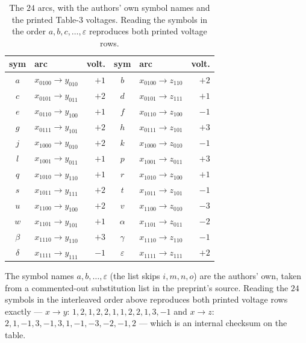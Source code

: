 \documentclass[11pt]{amsart}
\theoremstyle{remark}
\begin{document}
\begin{table}[ht]
\caption{The $24$ arcs, with the authors' own symbol names and the printed
Table-3 voltages. Reading the symbols in the order
$a,b,c,\dots,\varepsilon$ reproduces both printed voltage rows.}\label{tab:arcs}
\small
\begin{tabular}{@{}clr@{\qquad}clr@{}}
\toprule
sym & arc & volt. & sym & arc & volt.\\
\midrule
$a$ & $x_{0100}\to y_{010}$ & $+1$ & $b$ & $x_{0100}\to z_{110}$ & $+2$\\
$c$ & $x_{0101}\to y_{011}$ & $+2$ & $d$ & $x_{0101}\to z_{111}$ & $+1$\\
$e$ & $x_{0110}\to y_{100}$ & $+1$ & $f$ & $x_{0110}\to z_{100}$ & $-1$\\
$g$ & $x_{0111}\to y_{101}$ & $+2$ & $h$ & $x_{0111}\to z_{101}$ & $+3$\\
$j$ & $x_{1000}\to y_{010}$ & $+2$ & $k$ & $x_{1000}\to z_{010}$ & $-1$\\
$l$ & $x_{1001}\to y_{011}$ & $+1$ & $p$ & $x_{1001}\to z_{011}$ & $+3$\\
$q$ & $x_{1010}\to y_{110}$ & $+1$ & $r$ & $x_{1010}\to z_{100}$ & $+1$\\
$s$ & $x_{1011}\to y_{111}$ & $+2$ & $t$ & $x_{1011}\to z_{101}$ & $-1$\\
$u$ & $x_{1100}\to y_{100}$ & $+2$ & $v$ & $x_{1100}\to z_{010}$ & $-3$\\
$w$ & $x_{1101}\to y_{101}$ & $+1$ & $\alpha$ & $x_{1101}\to z_{011}$ & $-2$\\
$\beta$ & $x_{1110}\to y_{110}$ & $+3$ & $\gamma$ & $x_{1110}\to z_{110}$ & $-1$\\
$\delta$ & $x_{1111}\to y_{111}$ & $-1$ & $\varepsilon$ & $x_{1111}\to z_{111}$ & $+2$\\
\bottomrule
\end{tabular}
\end{table}

The symbol names $a, b, \dots, \varepsilon$ (the list skips $i, m, n, o$) are
the authors' own, taken from a commented-out substitution list in the
preprint's source. Reading the $24$ symbols in the
interleaved order above reproduces both printed voltage rows exactly ---
$x\!\to\!y$: $1,2,1,2,2,1,1,2,2,1,3,-1$ and $x\!\to\!z$:
$2,1,-1,3,-1,3,1,-1,-3,-2,-1,2$ --- which is an internal checksum on the table.
\end{document}
